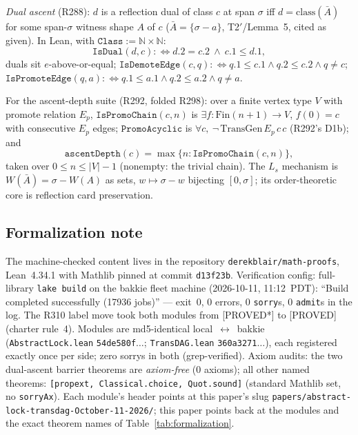 \documentclass[11pt,a4paper]{article}
\theoremstyle{definition}
\begin{document}
\emph{Dual ascent} (R288): $d$ is a reflection dual of class $c$ at span
$\sigma$ iff $d=\mathrm{class}(\bar A)$ for some span-$\sigma$ witness
shape $A$ of $c$ ($\bar A=\{\sigma-a\}$, T2$'$/Lemma~5, cited as given).
In Lean, with $\mathtt{Class}:=\mathbb{N}\times\mathbb{N}$:
\begin{equation}
  \label{eq:isdual}
  \mathtt{IsDual}(d,c):\Leftrightarrow d.2=c.2\ \land\ c.1\le d.1,
\end{equation}
duals sit $e$-above-or-equal;
$\mathtt{IsDemoteEdge}(c,q):\Leftrightarrow q.1\le c.1\land q.2\le
c.2\land q\neq c$;
$\mathtt{IsPromoteEdge}(q,a):\Leftrightarrow q.1\le a.1\land q.2\le
a.2\land q\neq a$.

For the ascent-depth suite (R292, folded R298): over a finite vertex
type $V$ with promote relation $E_p$,
$\mathtt{IsPromoChain}(c,n)$ is $\exists f:\mathrm{Fin}(n{+}1)\to V$,
$f(0)=c$ with consecutive $E_p$ edges;
$\mathtt{PromoAcyclic}$ is $\forall c,\ \lnot\,\mathrm{TransGen}\,
E_p\,c\,c$ (R292's D1b); and
\begin{equation}
  \label{eq:ascentdepth}
  \mathtt{ascentDepth}(c)=\max\{n:\mathtt{IsPromoChain}(c,n)\},
\end{equation}
taken over $0\le n\le|V|-1$ (nonempty: the trivial chain). The $L_s$
mechanism is $W(\bar A)=\sigma-W(A)$ as sets, $w\mapsto\sigma-w$ bijecting
$[0,\sigma]$; its order-theoretic core is reflection card preservation.

\subsection{Formalization note}
\label{sec:formalization}

The machine-checked content lives in the repository
\texttt{derekblair/math-proofs}, Lean~4.34.1 with Mathlib pinned at
commit \texttt{d13f23b}. Verification config: full-library
\texttt{lake build} on the bakkie fleet machine (2026-10-11, 11:12~PDT):
``Build completed successfully (17936 jobs)'' --- exit~$0$, $0$ errors,
$0$ \texttt{sorry}s, $0$ \texttt{admit}s in the log. The R310 label move
took both modules from [PROVED*] to [PROVED] (charter rule~4).
Modules are md5-identical local~$\leftrightarrow$~bakkie
(\texttt{AbstractLock.lean} \texttt{54de580f$\dots$};
\texttt{TransDAG.lean} \texttt{360a3271$\dots$}), each registered
exactly once per side; zero sorrys in both (grep-verified). Axiom
audits: the two dual-ascent barrier theorems are \emph{axiom-free}
($0$ axioms); all other named theorems:
\texttt{[propext, Classical.choice, Quot.sound]} (standard Mathlib set,
no \texttt{sorryAx}). Each module's header points at this paper's slug
\texttt{papers/abstract-lock-transdag-October-11-2026/}; this paper
points back at the modules and the exact theorem names of
Table~\ref{tab:formalization}.
\end{document}

